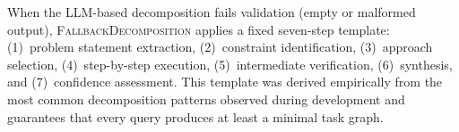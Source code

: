 \documentclass{iopjournal}
\newenvironment{algorithmic}[1][]{\begin{quote}\small}{\end{quote}}
\newcommand{\Require}{\textbf{Require:} }
\newcommand{\Ensure}{\textbf{Ensure:} }
\newcommand{\State}{\par\noindent}
\newcommand{\Comment}[1]{\hfill{\footnotesize(\textit{##1})}}
\newcommand{\For}[1]{\par\noindent\textbf{for} ##1 \textbf{do}}
\newcommand{\EndFor}{\par\noindent\textbf{end for}}
\newcommand{\If}[1]{\par\noindent\textbf{if} ##1 \textbf{then}}
\newcommand{\EndIf}{\par\noindent\textbf{end if}}
\newcommand{\Return}{\par\noindent\textbf{return} }
\begin{document}

When the LLM-based decomposition fails validation (empty or malformed output), \textsc{FallbackDecomposition} applies a fixed seven-step template: (1)~problem statement extraction, (2)~constraint identification, (3)~approach selection, (4)~step-by-step execution, (5)~intermediate verification, (6)~synthesis, and (7)~confidence assessment. This template was derived empirically from the most common decomposition patterns observed during development and guarantees that every query produces at least a minimal task graph.
\end{document}
